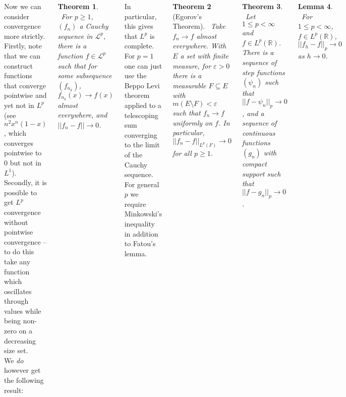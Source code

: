 \documentclass{tikzposter} %
\newtheorem{theorem}{Theorem}
\newtheorem{lemma}[theorem]{Lemma}
\begin{document}
\begin{columns}
{        Now we can consider convergence more strictly. Firstly, note that we can construct functions that converge pointwise and yet not in $L^{p}$ (see $n^{2}x^{n}(1-x)$, which converges pointwise to $0$ but not in $L^{1}$). Secondly, it is possible to get $L^{p}$ convergence without pointwise convergence -- to do this take any function which oscillates through values while being non-zero on a decreasing size set.\\

        We \emph{do} however get the following result: \\
        \begin{theorem}
        \ For $p \ge 1$, $(f_{n})$ a Cauchy sequence in $\mathcal{L}^{p}$, there is a function $f \in \mathcal{L}^{p}$ such that for some subsequence $(f_{n_{k}})$, $f_{n_{k}}(x) \to f(x)$ almost everywhere, and $||f_{n} - f|| \to 0$.
        \end{theorem}
        \hphantom{}

        In particular, this gives that $L^{p}$ is complete. \\

        For $p = 1$ one can just use the Beppo Levi theorem applied to a telescoping sum converging to the limit of the Cauchy sequence. For general $p$ we require Minkowski's inequality in addition to Fatou's lemma. \\

        \begin{theorem}[Egorov's Theorem]
        \ Take $f_{n} \to f$ almost everywhere. With $E$ a set with finite measure, for $\varepsilon > 0$ there is a measurable $F \subseteq E$ with $m(E \setminus F) < \varepsilon$ such that $f_{n} \to f$ uniformly on $f$. In particular, $||f_{n} - f||_{L^{p}(F)} \to 0$ for all $p \ge 1$.
        \end{theorem}
        \hphantom{}

        \begin{theorem}
        \ Let $1 \le p < \infty$ and $f \in L^{p}(\mathbb{R})$. There is a sequence of step functions $(\psi_{n})$ such that $||f - \psi_{n}||_{p} \to 0$, and a sequence of continuous functions $(g_{n})$ with compact support such that $||f-g_{n}||_{p} \to 0$.
        \end{theorem}
        \hphantom{}



        \begin{lemma}
        \ For $1 \le p < \infty$, $f \in L^{p}(\mathbb{R})$, $||f_{h} - f||_{p} \to 0$ as $h \to 0$.
        \end{lemma}
        \hphantom{}

}
\end{columns}
\end{document}
